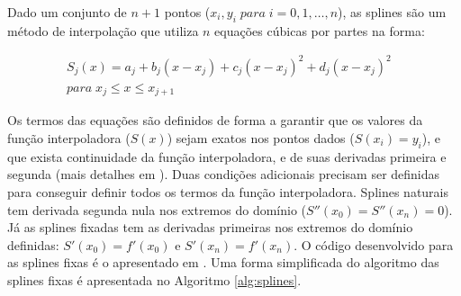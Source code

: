\documentclass[final,5p]{elsarticle}
\numberwithin{equation}{section}
\begin{document}
        Dado um conjunto de $n+1$ pontos ($x_i,y_i \; para \; i=0,1,\ldots,n$), as splines são um método de interpolação que utiliza $n$ equações cúbicas por partes na forma:
        
        \begin{align*}
            S_j(x) = a_j + b_j (x-x_j) + c_j (x-x_j)^2 + d_j (x-x_j)^2& \\
            para \; x_j \le x \le x_{j+1}&
        \end{align*}
        
        Os termos das equações são definidos de forma a garantir que os valores da função interpoladora ($S(x)$) sejam exatos nos pontos dados ($S(x_i)=y_i$), e que exista continuidade da função interpoladora, e de suas derivadas primeira e segunda (mais detalhes em \cite{relatoriosplinesnaturais}). Duas condições adicionais precisam ser definidas para conseguir definir todos os termos da função interpoladora. Splines naturais tem derivada segunda nula nos extremos do domínio ($S''(x_0)=S''(x_n)=0$). Já as splines fixadas tem as derivadas primeiras nos extremos do domínio definidas: $S'(x_0)=f'(x_0)$ e $S'(x_n)=f'(x_n)$. O código desenvolvido para as splines fixas é o apresentado em \cite{burden2016analise}. Uma forma simplificada do algoritmo das splines fixas é apresentada no Algoritmo \ref{alg:splines}. 
\end{document}
